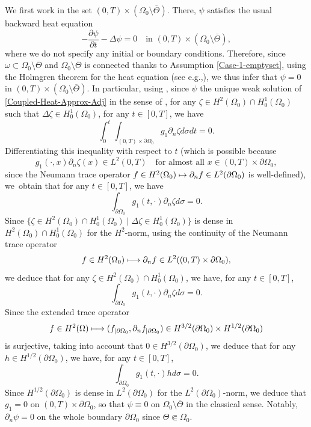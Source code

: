 \documentclass[11pt]{article}
\newcommand{\eg}{e.g.,\xspace}
\numberwithin{equation}{section}
\newcommand\mto{\mathchoice{\longmapsto}{\mapsto}{\mapsto}{\mapsto}}
\theoremstyle{definition}
\begin{document}
We first work in the set $(0,T) \times (\Omega_0 \setminus \overline{\Theta})$. There, $\psi$ satisfies the usual backward heat equation
\[
-\dfrac{\partial \psi}{\partial t}-\Delta \psi =0\quad\text{in }(0,T) \times(\Omega_0 \setminus \overline{\Theta}),
\]
where we do not specify any initial or boundary conditions.
Therefore, since $\omega \subset \Omega_0\setminus {\overline{\Theta}}$ and $\Omega_0\setminus {\overline{\Theta}}$ is connected thanks to Assumption \eqref{Case-1-emptyset}, using the Holmgren theorem for the heat equation (see \eg \cite[\S8.6 \& Th.\,8.6.5]{Hormander-2003}), we thus infer that $\psi = 0$ in $(0,T) \times (\Omega_0 \setminus \overline{\Theta})$.
In particular, using \cite[Prop.\,7.1.3]{TWBook}, since $\psi$ the unique weak solution of \eqref{Coupled-Heat-Approx-Adj} in the sense of \cite[Def.\,7.1.2, p.\,342]{TWBook}, for any $\zeta\in H^2(\Omega_0)\cap H^1_0(\Omega_0)$ such that $\Delta \zeta \in H^1_0(\Omega_0)$, for any $t\in [0,T]$, we have
\[
\int_0^t\int_{(0,T)\times\partial\Omega_0}g_1\partial_n \zeta d\sigma dt =0.
\]
Differentiating this inequality with respect to $t$ (which is possible because
\[
g_1(\cdot,x)\partial_n \zeta(x) \in L^2(0,T)\quad \text{for almost all $x\in (0,T)\times\partial\Omega_0$},
\]
since the Neumann trace operator $f\in H^2(\Omega_0) \mto \partial_n f\in L^2(\partial\Omega_0)$ is well-defined), we~obtain that for any $t\in [0,T]$, we have
\[
\int_{\partial\Omega_0}g_1(t,\cdot)\partial_n \zeta d\sigma =0.
\]
Since $\{\zeta \in H^2(\Omega_0)\cap H^1_0(\Omega_0)\mid \Delta \zeta \in H^1_0(\Omega_0)\}$ is dense in $H^2(\Omega_0)\cap H^1_0(\Omega_0)$ for the $H^2$-norm, using the continuity of the Neumann trace operator
\[
f\in H^2(\Omega_0) \mto \partial_n f\in L^2((0,T)\times\partial\Omega_0),
\]
we deduce that for any $\zeta\in H^2(\Omega_0)\cap H^1_0(\Omega_0)$, we have, for any $t\in [0,T]$,
\[
\int_{\partial\Omega_0}g_1(t,\cdot)\partial_n \zeta d\sigma =0.
\]
Since the extended trace operator
\[
f\in H^2(\Omega)\mto (f_{|\partial\Omega_0},\partial_n f_{|\partial\Omega_0}) \in H^{3/2}(\partial\Omega_0)\times H^{1/2}(\partial\Omega_0)
\]
is surjective, taking into account that $0\in H^{3/2}(\partial\Omega_0)$, we deduce that for any $h\in H^{1/2}(\partial\Omega_0)$, we have, for any $t\in [0,T]$,
\[
\int_{\partial\Omega_0}g_1(t,\cdot) h d\sigma =0.
\]
Since $H^{1/2}(\partial\Omega_0)$ is dense in $L^2(\partial\Omega_0)$ for the $L^2(\partial\Omega_0)$-norm, we deduce that $g_1 = 0$ on $(0,T)\times \partial\Omega_0$, so that $\psi \equiv 0$ on $\Omega_0\setminus \overline{\Theta}$ in the classical sense. Notably, $\partial_n \psi= 0$ on the whole boundary $\partial \Omega_0$ since $\Theta \Subset \Omega_0$.
\end{document}
